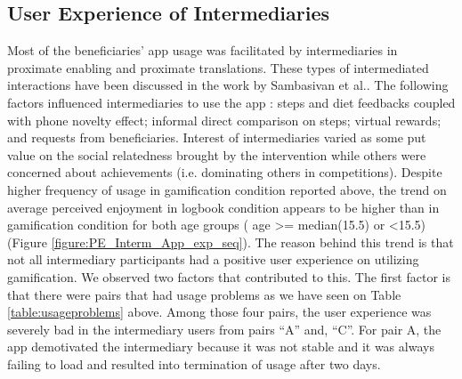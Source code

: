 \documentclass{sig-alternate}
\begin{document}
\subsection{User Experience of Intermediaries}
Most of the beneficiaries' app usage was facilitated by intermediaries  in proximate enabling and proximate translations. These types of intermediated interactions have been discussed in the work by Sambasivan et al.\cite{sambasivan2010}. The following factors influenced intermediaries to use the app : steps and diet feedbacks coupled with phone novelty effect; informal direct comparison on steps; virtual rewards; and requests from beneficiaries. Interest of intermediaries varied as some put value on the social relatedness brought by the intervention while others were concerned about achievements (i.e. dominating others in competitions).\newline
Despite higher frequency of usage in gamification condition reported above, the trend on average perceived enjoyment in logbook condition appears to be higher than in gamification condition for both age groups ( age \textgreater = median(15.5) or \textless 15.5) (Figure \ref{figure:PE_Interm_App_exp_seq}). The reason behind this trend is that not all intermediary participants had a positive user experience on utilizing gamification. We observed two factors that contributed  to this. The first factor is that there were pairs that had usage problems as we have seen on Table \ref{table:usageproblems} above. Among those four pairs, the user experience was severely bad in the intermediary users from pairs ``A'' and, ``C''.\newline
For pair A, the app demotivated the intermediary because it was not stable  and it was always failing to load and resulted into termination of usage after two days.\newline
\end{document}
